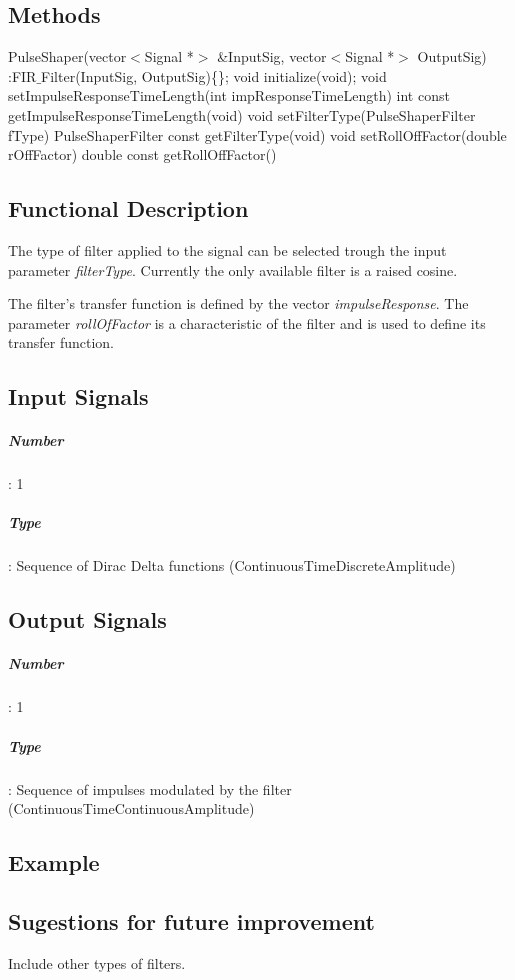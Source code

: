 \subsection*{Methods}

PulseShaper(vector$<$Signal *$>$ \&InputSig, vector$<$Signal *$>$ OutputSig) :FIR$\_$Filter(InputSig, OutputSig)\{\};
\bigbreak	
void initialize(void);
\bigbreak	
void setImpulseResponseTimeLength(int impResponseTimeLength)
\bigbreak
int const getImpulseResponseTimeLength(void)
\bigbreak	
void setFilterType(PulseShaperFilter fType)
\bigbreak
PulseShaperFilter const getFilterType(void)
\bigbreak	
void setRollOffFactor(double rOffFactor)
\bigbreak
double const getRollOffFactor()

\subsection*{Functional Description}

The type of filter applied to the signal can be selected trough the input parameter \textit{filterType}. Currently the only available filter is a raised cosine.

The filter's transfer function is defined by the vector \textit{impulseResponse}. The parameter \textit{rollOfFactor} is a characteristic of the filter and is used to define its transfer function.

\subsection*{Input Signals}

\subparagraph*{Number}: 1

\subparagraph*{Type}: Sequence of Dirac Delta functions (ContinuousTimeDiscreteAmplitude)

\subsection*{Output Signals}

\subparagraph*{Number}: 1

\subparagraph*{Type}: Sequence of impulses modulated by the filter (ContinuousTimeContinuousAmplitude)

\subsection*{Example}


\subsection*{Sugestions for future improvement}

Include other types of filters.
